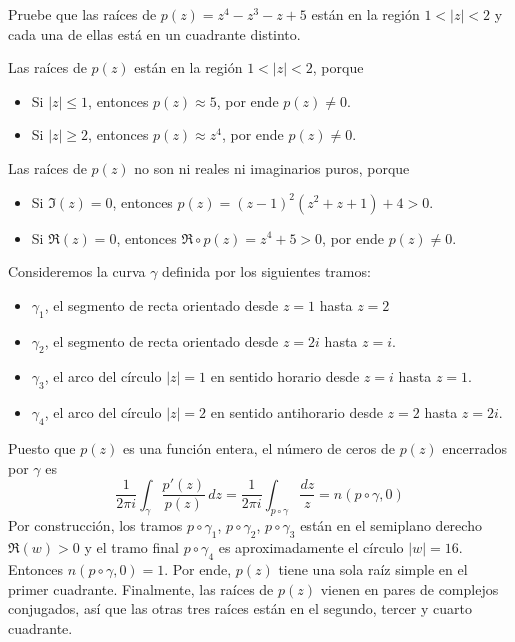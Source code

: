 \begin{exercise}
Pruebe que las raíces de $p(z) = z^4 - z^3 - z + 5$ están en la región $1 < |z| < 2$ y cada una de ellas está en un cuadrante distinto.
\end{exercise}

\begin{solution}
Las raíces de $p(z)$ están en la región $1 < |z| < 2$, porque
\begin{itemize}
    \item Si $|z| \le 1$, entonces $p(z) \approx 5$, por ende $p(z) \ne 0$.
    \item Si $|z| \ge 2$, entonces $p(z) \approx z^4$, por ende $p(z) \ne 0$.
\end{itemize}
Las raíces de $p(z)$ no son ni reales ni imaginarios puros, porque
\begin{itemize}
    \item Si $\Im(z) = 0$, entonces $p(z) = (z - 1)^2 (z^2 + z + 1) + 4 > 0$.
    \item Si $\Re(z) = 0$, entonces $\Re \circ p(z) = z^4 + 5 > 0$, por ende $p(z) \ne 0$.
\end{itemize}
Consideremos la curva $\gamma$ definida por los siguientes tramos:
\begin{itemize}
    \item $\gamma_1$, el segmento de recta orientado desde $z = 1$ hasta $z = 2$
    \item $\gamma_2$, el segmento de recta orientado desde $z = 2i$ hasta $z = i$.
    \item $\gamma_3$, el arco del círculo $|z| = 1$ en sentido horario desde $z = i$ hasta $z = 1$.
    \item $\gamma_4$, el arco del círculo $|z| = 2$ en sentido antihorario desde $z = 2$ hasta $z = 2i$.
\end{itemize}
Puesto que $p(z)$ es una función entera, el número de ceros de $p(z)$ encerrados por $\gamma$ es
$$
\frac 1 {2\pi i} \int_\gamma \frac {p'(z)} {p(z)} \, dz
    = \frac 1 {2\pi i} \int_{p \circ \gamma} \frac {dz} z
    = n(p \circ \gamma, 0)
$$
Por construcción, los tramos $p \circ \gamma_1$, $p \circ \gamma_2$, $p \circ \gamma_3$ están en el semiplano derecho $\Re(w) > 0$ y el tramo final $p \circ \gamma_4$ es aproximadamente el círculo $|w| = 16$. Entonces $n(p \circ \gamma, 0) = 1$. Por ende, $p(z)$ tiene una sola raíz simple en el primer cuadrante. Finalmente, las raíces de $p(z)$ vienen en pares de complejos conjugados, así que las otras tres raíces están en el segundo, tercer y cuarto cuadrante.
\end{solution}
